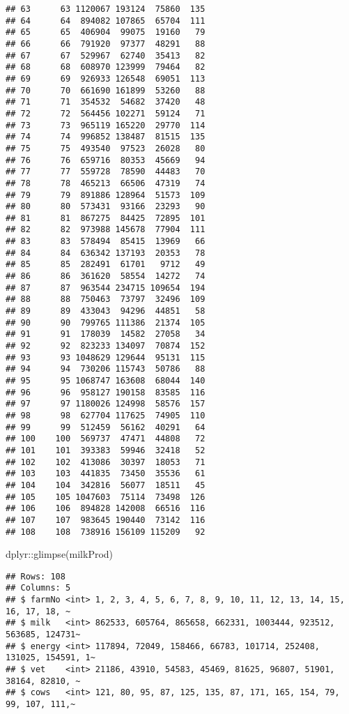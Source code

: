 \documentclass[
]{article}
\newenvironment{Shaded}{\begin{snugshade}}{\end{snugshade}}
\newcommand{\FunctionTok}[1]{\textcolor[rgb]{0.00,0.00,0.00}{#1}}
\newcommand{\NormalTok}[1]{#1}
\newcommand{\SpecialCharTok}[1]{\textcolor[rgb]{0.00,0.00,0.00}{#1}}
\begin{document}
\begin{verbatim}
## 63      63 1120067 193124  75860  135
## 64      64  894082 107865  65704  111
## 65      65  406904  99075  19160   79
## 66      66  791920  97377  48291   88
## 67      67  529967  62740  35413   82
## 68      68  608970 123999  79464   82
## 69      69  926933 126548  69051  113
## 70      70  661690 161899  53260   88
## 71      71  354532  54682  37420   48
## 72      72  564456 102271  59124   71
## 73      73  965119 165220  29770  114
## 74      74  996852 138487  81515  135
## 75      75  493540  97523  26028   80
## 76      76  659716  80353  45669   94
## 77      77  559728  78590  44483   70
## 78      78  465213  66506  47319   74
## 79      79  891886 128964  51573  109
## 80      80  573431  93166  23293   90
## 81      81  867275  84425  72895  101
## 82      82  973988 145678  77904  111
## 83      83  578494  85415  13969   66
## 84      84  636342 137193  20353   78
## 85      85  282491  61701   9712   49
## 86      86  361620  58554  14272   74
## 87      87  963544 234715 109654  194
## 88      88  750463  73797  32496  109
## 89      89  433043  94296  44851   58
## 90      90  799765 111386  21374  105
## 91      91  178039  14582  27058   34
## 92      92  823233 134097  70874  152
## 93      93 1048629 129644  95131  115
## 94      94  730206 115743  50786   88
## 95      95 1068747 163608  68044  140
## 96      96  958127 190158  83585  116
## 97      97 1180026 124998  58576  157
## 98      98  627704 117625  74905  110
## 99      99  512459  56162  40291   64
## 100    100  569737  47471  44808   72
## 101    101  393383  59946  32418   52
## 102    102  413086  30397  18053   71
## 103    103  441835  73450  35536   61
## 104    104  342816  56077  18511   45
## 105    105 1047603  75114  73498  126
## 106    106  894828 142008  66516  116
## 107    107  983645 190440  73142  116
## 108    108  738916 156109 115209   92
\end{verbatim}

\begin{Shaded}
\begin{Highlighting}[]
\NormalTok{dplyr}\SpecialCharTok{::}\FunctionTok{glimpse}\NormalTok{(milkProd)}
\end{Highlighting}
\end{Shaded}

\begin{verbatim}
## Rows: 108
## Columns: 5
## $ farmNo <int> 1, 2, 3, 4, 5, 6, 7, 8, 9, 10, 11, 12, 13, 14, 15, 16, 17, 18, ~
## $ milk   <int> 862533, 605764, 865658, 662331, 1003444, 923512, 563685, 124731~
## $ energy <int> 117894, 72049, 158466, 66783, 101714, 252408, 131025, 154591, 1~
## $ vet    <int> 21186, 43910, 54583, 45469, 81625, 96807, 51901, 38164, 82810, ~
## $ cows   <int> 121, 80, 95, 87, 125, 135, 87, 171, 165, 154, 79, 99, 107, 111,~
\end{verbatim}
\end{document}
